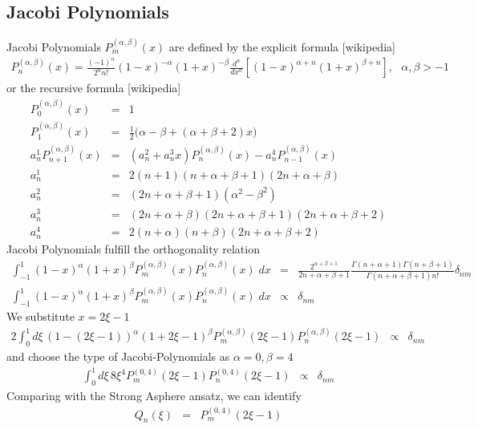 \documentclass[10pt]{revtex4-1}
\begin{document}
\subsection{Jacobi Polynomials}
Jacobi Polynomials $P_m^{(\alpha,\beta)} (x)$ are defined by the explicit formula [wikipedia]
\begin{eqnarray}
  P_n^{(\alpha,\beta)} (x) = \frac{(-1)^n}{2^n n!}(1-x)^{-\alpha}(1+x)^{-\beta}\frac{d^n}{dx^n}\left[(1-x)^{\alpha+n}(1+x)^{\beta+n}\right],~~~\alpha,\beta>-1
\end{eqnarray}
or the recursive formula [wikipedia]
\begin{eqnarray}
  P_0^{(\alpha,\beta)} (x) &=& 1 \\
  P_1^{(\alpha,\beta)} (x) &=& \frac{1}{2}\bigl(\alpha-\beta+(\alpha+\beta+2)x\bigr) \\
  a^1_n P_{n+1}^{(\alpha,\beta)} (x) &=& (a_n^2+a_n^3x)P_n^{(\alpha,\beta)} (x) -a_n^4P_{n-1}^{(\alpha,\beta)} (x) \\
  a^1_n &=& 2(n+1)(n+\alpha+\beta+1)(2n+\alpha+\beta) \\
  a^2_n &=& (2n+\alpha+\beta+1)(\alpha^2-\beta^2) \\
  a^3_n &=& (2n+\alpha+\beta)(2n+\alpha+\beta+1)(2n+\alpha+\beta+2) \\
  a_n^4 &=& 2(n+\alpha)(n+\beta)(2n+\alpha+\beta+2)
\end{eqnarray}
Jacobi Polynomials fulfill the orthogonality relation
\begin{eqnarray}
  \int_{-1}^1 (1-x)^{\alpha} (1+x)^{\beta} 
    P_m^{(\alpha,\beta)} (x)P_n^{(\alpha,\beta)} (x) \; dx 
	  &=& 
	  \frac{2^{\alpha+\beta+1}}{2n+\alpha+\beta+1}
    \frac{\Gamma(n+\alpha+1)\Gamma(n+\beta+1)}{\Gamma(n+\alpha+\beta+1)n!} \delta_{nm}
	\\
	\int_{-1}^1 (1-x)^{\alpha} (1+x)^{\beta} 
    P_m^{(\alpha,\beta)} (x)P_n^{(\alpha,\beta)} (x) \; dx 
	  &\propto& 
	  \delta_{nm}
\end{eqnarray}
We substitute $x = 2\xi-1$
\begin{eqnarray}
 	2 \int_0^1 d\xi\, (1-(2\xi-1))^{\alpha} (1+2\xi-1)^{\beta} 
    P_m^{(\alpha,\beta)} (2\xi-1) P_n^{(\alpha,\beta)} (2\xi-1) 
	  &\propto& 
	  \delta_{nm}
\end{eqnarray}
and choose the type of Jacobi-Polynomials as $\alpha=0,\beta=4$
\begin{eqnarray}
 	\int_0^1 d\xi\,  8\xi^{4} 
    P_m^{(0,4)} (2\xi-1) P_n^{(0,4)} (2\xi-1) 
	  &\propto& 
	  \delta_{nm}
\end{eqnarray}
Comparing with the Strong Asphere ansatz, we can identify
\begin{eqnarray}
Q_n(\xi) &=& P_m^{(0,4)} (2\xi-1)
\end{eqnarray}
\end{document}
